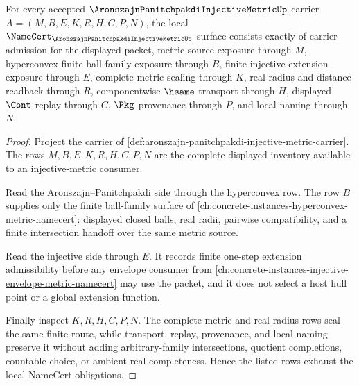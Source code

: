 \begin{theorem}
\label{thm:aronszajn-panitchpakdi-injective-metric-obligations}
For every accepted $\AronszajnPanitchpakdiInjectiveMetricUp$ carrier $A=(M,B,E,K,R,H,C,P,N)$, the local $\NameCert_{\AronszajnPanitchpakdiInjectiveMetricUp}$ surface consists exactly of carrier admission for the displayed packet, metric-source exposure through $M$, hyperconvex finite ball-family exposure through $B$, finite injective-extension exposure through $E$, complete-metric sealing through $K$, real-radius and distance readback through $R$, componentwise $\hsame$ transport through $H$, displayed $\Cont$ replay through $C$, $\Pkg$ provenance through $P$, and local naming through $N$.
\end{theorem}
\begin{proof}
Project the carrier of \autoref{def:aronszajn-panitchpakdi-injective-metric-carrier}. The rows $M,B,E,K,R,H,C,P,N$ are the complete displayed inventory available to an injective-metric consumer.

Read the Aronszajn--Panitchpakdi side through the hyperconvex row. The row $B$ supplies only the finite ball-family surface of \autoref{ch:concrete-instances-hyperconvex-metric-namecert}: displayed closed balls, real radii, pairwise compatibility, and a finite intersection handoff over the same metric source.

Read the injective side through $E$. It records finite one-step extension admissibility before any envelope consumer from \autoref{ch:concrete-instances-injective-envelope-metric-namecert} may use the packet, and it does not select a host hull point or a global extension function.

Finally inspect $K,R,H,C,P,N$. The complete-metric and real-radius rows seal the same finite route, while transport, replay, provenance, and local naming preserve it without adding arbitrary-family intersections, quotient completions, countable choice, or ambient real completeness. Hence the listed rows exhaust the local NameCert obligations.
\end{proof}

